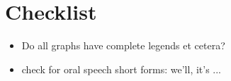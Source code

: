 \chapter{Checklist}
\begin{itemize}
    \item Do all graphs have complete legends et cetera?
    \item check for oral speech short forms: we'll, it's ...
\end{itemize}